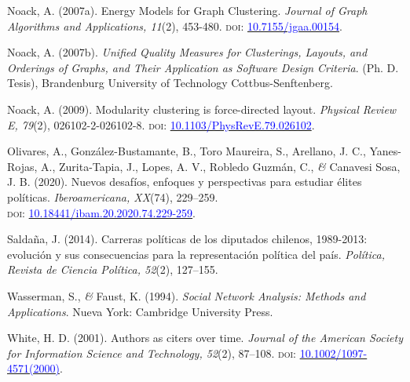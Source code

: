 \documentclass[a4paper]{tufte-handout}
\begin{document}
{\begin{list}{}
\item{\small Noack, A. (2007a). Energy Models for Graph Clustering. {\itshape Journal of Graph Algorithms and Applications, 11}(2), 453-480. {\scshape doi:} \href{http://dx.doi.org/10.7155/jgaa.00154}{\textcolor{blue}{10.7155/jgaa.00154}}.}

\item{\small Noack, A. (2007b). {\itshape Unified Quality Measures for Clusterings, Layouts, and Orderings of Graphs, and Their Application as Software Design Criteria}. (Ph. D. Tesis), Brandenburg University of Technology Cottbus-Senftenberg.}

\item{\small Noack, A. (2009). Modularity clustering is force-directed layout. {\itshape Physical Review E, 79}(2), 026102-2-026102-8. {\scshape doi:} \href{https://doi.org/10.1103/PhysRevE.79.026102}{\textcolor{blue}{10.1103/PhysRevE.79.026102}}.}

\item{\small Olivares, A., González-Bustamante, B., Toro Maureira, S., Arellano, J. C., Yanes-Rojas, A., Zurita-Tapia, J., Lopes, A. V., Robledo Guzmán, C., {\itshape \&} Canavesi Sosa, J. B. (2020). Nuevos desafíos, enfoques y perspectivas para estudiar élites políticas. {\itshape Iberoamericana, XX}(74), 229--259. \\ {\scshape doi:} \href{http://doi.org/10.18441/ibam.20.2020.74.229-259}{\textcolor{blue}{10.18441/ibam.20.2020.74.229-259}}.}

\item{\small Saldaña, J. (2014). Carreras políticas de los diputados chilenos, 1989-2013: evolución y sus consecuencias para la representación política del país. {\itshape Política, Revista de Ciencia Política, 52}(2), 127--155.}

\item{\small Wasserman, S., {\itshape \&} Faust, K. (1994). {\itshape Social Network Analysis: Methods and Applications}. Nueva York: Cambridge University Press.}

\item{\small White, H. D. (2001). Authors as citers over time. {\itshape Journal of the American Society for Information Science and Technology, 52}(2), 87--108. {\scshape doi}: \href{https://doi.org/10.1002/1097-4571(2000)9999:9999\%3C::AID-ASI1542\%3E3.0.CO;2-T}{\textcolor{blue}{10.1002/1097-4571(2000)}}.}
\end{list}


}
\end{document}
